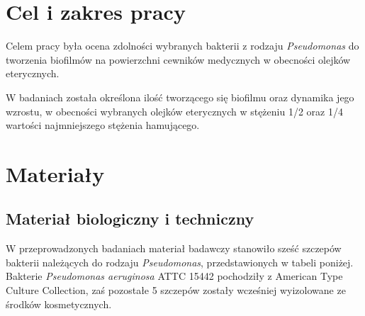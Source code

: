 \documentclass[11pt,a4paper]{report}
\begin{document}










\chapter{Cel i zakres pracy}


Celem pracy była ocena zdolności wybranych bakterii z rodzaju \textit{Pseudomonas} do tworzenia biofilmów na powierzchni cewników medycznych w obecności olejków eterycznych.


W badaniach została określona ilość tworzącego się biofilmu oraz dynamika jego wzrostu, w obecności wybranych olejków eterycznych w stężeniu 1/2 oraz 1/4 wartości najmniejszego stężenia hamującego.


\chapter{Materiały}

\section{Materiał biologiczny i techniczny}

W przeprowadzonych badaniach materiał badawczy stanowiło sześć szczepów bakterii należących do rodzaju \textit{Pseudomonas}, przedstawionych w tabeli poniżej.
Bakterie \textit{Pseudomonas aeruginosa} ATTC 15442 pochodziły z American Type Culture Collection, zaś pozostałe 5 szczepów zostały wcześniej wyizolowane ze środków kosmetycznych.\\
\end{document}
